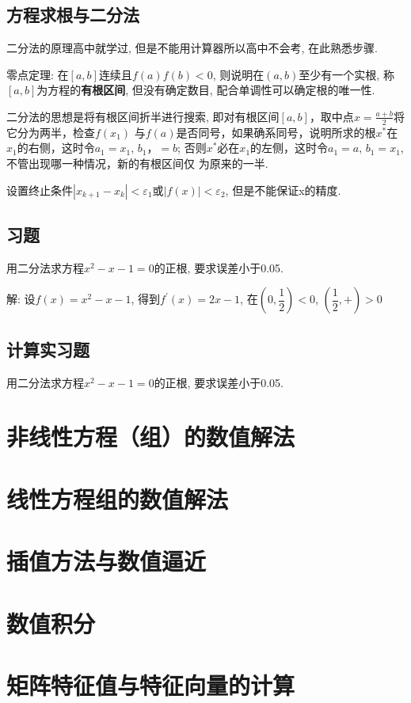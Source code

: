 \documentclass[lang=cn,newtx,12pt,scheme=chinese]{elegantbook}
\begin{document}
\section{方程求根与二分法}
二分法的原理高中就学过, 但是不能用计算器所以高中不会考, 在此熟悉步骤.

零点定理: 在$[a,b]$连续且$f(a)f(b)<0$, 则说明在$(a,b)$至少有一个实根, 称$[a,b]$为方程的\textbf{有根区间}, 但没有确定数目, 配合单调性可以确定根的唯一性. 



二分法的思想是将有根区间折半进行搜索, 即对有根区间$[a,b]$，取中点$x=\frac{a+b}{2}$将它分为两半，检查$f(x_1)$
与$f(a)$是否同号，如果确系同号，说明所求的根$x^*$在$x_1$的右侧，这时令$a_1=x_1,\,b_1，=b$; 否则$x^*$必在$x_1$的左侧，这时令$a_1=a,\,b_1=x_1$, 不管出现哪一种情况，新的有根区间仅
为原来的一半.


设置终止条件$|x_{k+1}-x_k|<\varepsilon_1$或$|f(x)|<\varepsilon_2$, 但是不能保证x的精度.
\section{习题}
\begin{exercise}
	用二分法求方程$x^2-x-1=0$的正根, 要求误差小于0.05.
\end{exercise}
解: 设$f(x)=x^2-x-1$, 得到$f^{'}(x)=2x-1$, 在$(0,\dfrac{1}{2})<0$, $(\dfrac{1}{2},+)>0$
\section{计算实习题}
\begin{exercise}
	用二分法求方程$x^2-x-1=0$的正根, 要求误差小于0.05.
\end{exercise}
\chapter{非线性方程（组）的数值解法}

\chapter{线性方程组的数值解法}

\chapter{插值方法与数值逼近}
\chapter{数值积分}
\chapter{矩阵特征值与特征向量的计算}
\end{document}
